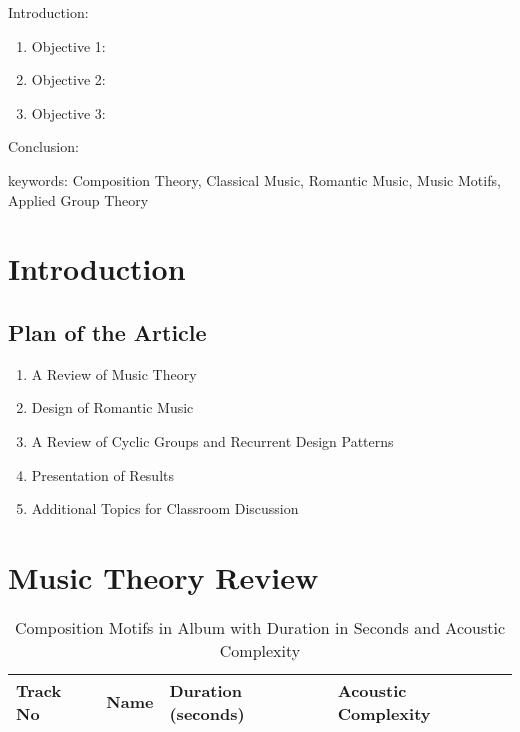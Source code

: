 
\twocolumn
\scriptsize
\begin{frontmatter}
		\title{}
		\author{}
		\address{The Mathematical Learning Space}
\end{frontmatter}	

Introduction:
\begin{enumerate}
\item Objective 1:
\item Objective 2:
\item Objective 3:
\end{enumerate}
Conclusion:

keywords: Composition Theory, Classical Music, Romantic Music, Music Motifs, Applied Group Theory

\section{Introduction}

\subsection{Plan of the Article}

\begin{enumerate}
\item A Review of Music Theory 
\item Design of Romantic Music
\item A Review of Cyclic Groups and Recurrent Design Patterns 
\item Presentation of Results
\item Additional Topics for Classroom Discussion
\end{enumerate}

\section{Music Theory Review}


\begin{table}[H]
	\caption{Composition Motifs in Album with Duration in Seconds and Acoustic Complexity}	
	\begin{tabular}{p{1cm}p{4cm}p{2cm}p{2cm}}
	\hline
	Track No & Name & Duration (seconds) & Acoustic Complexity\\
	\hline
	\hline 
	\end{tabular}
\end{table}

